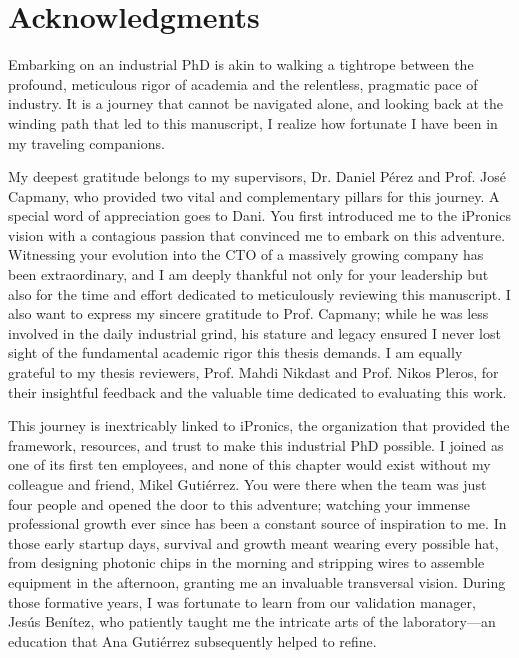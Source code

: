 

\chapter*{Acknowledgments}


Embarking on an industrial PhD is akin to walking a tightrope between the profound, meticulous 
rigor of academia and the relentless, pragmatic pace of industry. It is a journey that cannot be 
navigated alone, and looking back at the winding path that led to this manuscript, I realize how 
fortunate I have been in my traveling companions.

My deepest gratitude belongs to my supervisors, Dr. Daniel Pérez and Prof. José Capmany, who 
provided two vital and complementary pillars for this journey. A special word of appreciation goes 
to Dani. You first introduced me to the iPronics vision with a contagious passion that convinced me 
to embark on this adventure. Witnessing your evolution into the CTO of a massively growing company 
has been extraordinary, and I am deeply thankful not only for your leadership but also for the time 
and effort dedicated to meticulously reviewing this manuscript. I also want to express my sincere 
gratitude to Prof. Capmany; while he was less involved in the daily industrial grind, his stature 
and legacy ensured I never lost sight of the fundamental academic rigor this thesis demands. I am 
equally grateful to my thesis reviewers, Prof. Mahdi Nikdast and Prof. Nikos Pleros, for their 
insightful feedback and the valuable time dedicated to evaluating this work.

This journey is inextricably linked to iPronics, the organization that provided the framework, 
resources, and trust to make this industrial PhD possible. I joined as one of its first ten 
employees, and none of this chapter would exist without my colleague and friend, Mikel Gutiérrez. 
You were there when the team was just four people and opened the door to this adventure; watching 
your immense professional growth ever since has been a constant source of inspiration to me. In 
those early startup days, survival and growth meant wearing every possible hat, from designing 
photonic chips in the morning and stripping wires to assemble equipment in the afternoon, granting 
me an invaluable transversal vision. During those formative years, I was fortunate to learn from 
our validation manager, Jesús Benítez, who patiently taught me the intricate arts of the 
laboratory—an education that Ana Gutiérrez subsequently helped to refine.

